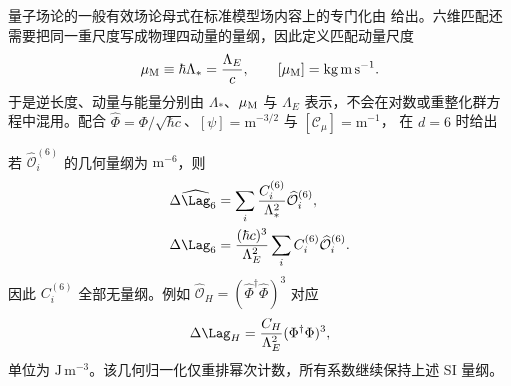 量子场论的一般有效场论母式在标准模型场内容上的专门化由 给出。六维匹配还需要把同一重尺度写成物理四动量的量纲，因此定义匹配动量尺度
\begin{equation}
{\mu_{\rm M}\equiv\hbar\Lambda_*=\frac{\Lambda_E}{c}},
\qquad [\mu_{\rm M}]=\mathrm{kg\,m\,s^{-1}}.
\label{eq:smeft-matching-momentum-dp13}
\end{equation}
于是逆长度、动量与能量分别由 $\Lambda_*$、$\mu_{\rm M}$ 与 $\Lambda_E$ 表示，不会在对数或重整化群方程中混用。配合 $\widehat\Phi=\Phi/\sqrt{\hbar c}$、$[\psi]=\mathrm{m^{-3/2}}$ 与 $[\mathscr C_\mu]=\mathrm{m^{-1}}$， 在 $d=6$ 时给出

若 $\widehat{\mathcal O}_i^{(6)}$ 的几何量纲为 $\mathrm{m^{-6}}$，则
\begin{align}
\Delta\widehat\Lag_6
&=\sum_i\frac{C_i^{(6)}}{\Lambda_*^2}\widehat{\mathcal O}_i^{(6)},
\label{eq:smeft-geometric-normalization-dp13}\\
\Delta\Lag_6
&=\frac{(\hbar c)^3}{\Lambda_E^2}
\sum_iC_i^{(6)}\widehat{\mathcal O}_i^{(6)}.
\label{eq:smeft-si-normalization-dp13}
\end{align}
因此 $C_i^{(6)}$ 全部无量纲。例如 $\widehat{\mathcal O}_H=(\widehat\Phi^\dagger\widehat\Phi)^3$ 对应
\begin{equation*}
\Delta\Lag_H=\frac{C_H}{\Lambda_E^2}(\Phi^\dagger\Phi)^3,
\end{equation*}
单位为 $\mathrm{J\,m^{-3}}$。该几何归一化仅重排幂次计数，所有系数继续保持上述 SI 量纲。


